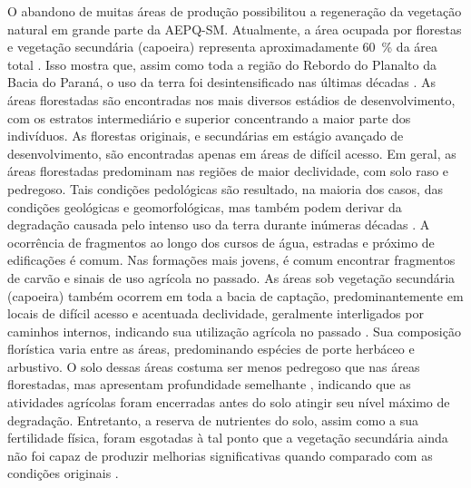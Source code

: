 
O abandono de muitas áreas de produção possibilitou a regeneração da vegetação natural em grande 
parte da AEPQ-SM. Atualmente, a área ocupada por florestas e vegetação secundária (capoeira) 
representa aproximadamente \SI{60}{\percent} da área total \citep{SamuelRosaEtAl2011a}. Isso mostra 
que, assim como toda a região do Rebordo do Planalto da Bacia do Paraná, o uso da terra foi 
desintensificado nas últimas décadas \citep{SEMA/UFSM2001, DillEtAl2004, Poelking2007, Miguel2010, 
SamuelRosaEtAl2011a, Dullius2012, tenCatenEtAl2012}. As áreas florestadas são encontradas nos mais 
diversos estádios de desenvolvimento, com os estratos intermediário e superior concentrando a maior 
parte dos indivíduos. As florestas originais, e secundárias em estágio avançado de desenvolvimento, 
são encontradas apenas em áreas de difícil acesso. Em geral, as áreas florestadas predominam nas 
regiões de maior declividade, com solo raso e pedregoso. Tais condições pedológicas são resultado, 
na maioria dos casos, das condições geológicas e geomorfológicas, mas também podem derivar da 
degradação causada pelo intenso uso da terra durante inúmeras décadas \citep{SamuelRosaEtAl2011a}. 
A ocorrência de fragmentos ao longo dos cursos de água, estradas e próximo de edificações é comum. 
Nas formações mais jovens, é comum encontrar fragmentos de carvão e sinais de uso agrícola no 
passado. As áreas sob vegetação secundária (capoeira) também ocorrem em toda a bacia de captação, 
predominantemente em locais de difícil acesso e acentuada declividade, geralmente interligados por 
caminhos internos, indicando sua utilização agrícola no passado \citep{SamuelRosaEtAl2011a}. Sua 
composição florística varia entre as áreas, predominando espécies de porte herbáceo e arbustivo. O 
solo dessas áreas costuma ser menos pedregoso que nas áreas florestadas, mas apresentam profundidade
semelhante \citep{SamuelRosaEtAl2011a}, indicando que as atividades agrícolas foram encerradas antes
do solo atingir seu nível máximo de degradação. Entretanto, a reserva de nutrientes do solo, assim 
como a sua fertilidade física, foram esgotadas à tal ponto que a vegetação secundária ainda não foi 
capaz de produzir melhorias significativas quando comparado com as condições originais 
\citep{Menezes2008, Zalamena2008}.

